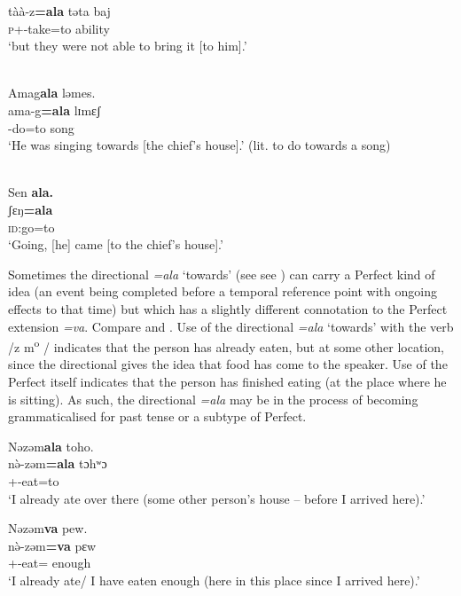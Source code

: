       \medskip
\gll tàà-z\textbf{=ala}  təta    baj\\      
     \textsc{p}+{\HOR}-take=to      ability  {\NEG}\\ 
\glt  ‘but they were not able to bring it [to him].'\\  
\z 

\ea\label{ex:7:119}\\
Amag\textbf{ala}  ləmes.\\
\gll  ama-g\textbf{=ala}  lɪmɛʃ\\
      {\DEP}-do=to  song\\
\glt  ‘He was singing towards [the chief’s house].' (lit. to do towards a song)\\
\z 

\medskip
\ea\label{ex:7:120}\\
Sen  \textbf{ala}\textbf{.}\\
\gll  ʃɛŋ\textbf{=ala}\\
      \textsc{id}:go=to\\
\glt  ‘Going, [he] came [to the chief’s house].’\\
\z 

Sometimes the directional \textit{=ala} ‘towards’ (see see ) can carry a Perfect kind of idea (an event being completed before a temporal reference point with ongoing effects to that time) but which has a slightly different connotation to the Perfect extension \textit{=va}. Compare  and . Use of the directional \textit{=ala} ‘towards’  with the verb /z m\textsuperscript{o}\textit{ }/ indicates that the person has already eaten, but at some other location, since the directional gives the idea that food has come to the speaker. Use of the Perfect itself  indicates that the person has finished eating (at the place where he is sitting). As such, the directional\textit{ =ala } may be in the process of becoming grammaticalised for past tense or a subtype of Perfect.

\ea\label{ex:7:121}
Nəzəm\textbf{ala} toho.\\
\gll  n\`ə-zəm\textbf{=ala} tɔhʷɔ\\
      {\oneS}+{\PFV}-eat=to  {\DEM}\\
\glt  ‘I already ate over there (some other person’s house – before I arrived here).’\\
\z 

\ea\label{ex:7:122}
Nəzəm\textbf{va} pew.\\
\gll  n\`ə-zəm\textbf{=va} pɛw\\
      {\oneS}+{\PFV}-eat={\PRF}  enough\\
\glt  ‘I already ate/ I have eaten enough (here in this place since I arrived here).’\\
\z 

